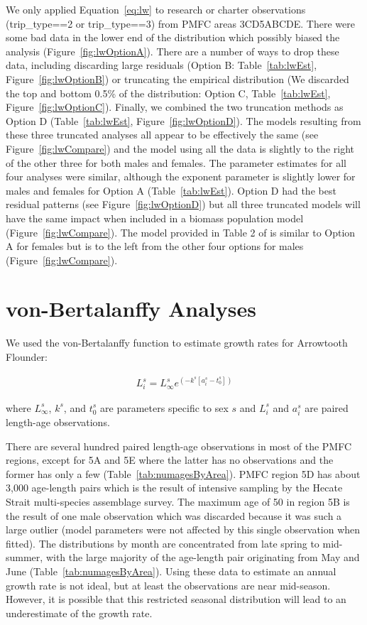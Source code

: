 We only applied Equation~\eqref{eq:lw} to research or charter observations (trip\_type==2 or trip\_type==3) from PMFC areas 3CD5ABCDE. There were some bad data in the lower end of the distribution which possibly biased the analysis (Figure~\ref{fig:lwOptionA}). There are a number of ways to drop these data, including discarding large residuals (Option B: Table~\ref{tab:lwEst}, Figure~\ref{fig:lwOptionB}) or truncating the empirical distribution (We discarded the top and bottom 0.5\% of the distribution: Option C, Table~\ref{tab:lwEst}, Figure~\ref{fig:lwOptionC}). Finally, we combined the two truncation methods as Option D (Table~\ref{tab:lwEst}, Figure~\ref{fig:lwOptionD}). The models resulting from these three truncated analyses all appear to be effectively the same (see Figure~\ref{fig:lwCompare}) and the model using all the data is slightly to the right of the other three for both males and females. The parameter estimates for all four analyses were similar, although the exponent parameter is slightly lower for males and females for Option A (Table~\ref{tab:lwEst}). Option D had the best residual patterns (see Figure~\ref{fig:lwOptionD}) but all three truncated models will have the same impact when included in a biomass population model (Figure~\ref{fig:lwCompare}).  The model provided in Table 2 of \citet{arf2001} is similar to Option A for females but is to the left from the other four options for males (Figure~\ref{fig:lwCompare}).

\section{von-Bertalanffy Analyses}

We used the von-Bertalanffy function to estimate growth rates for Arrowtooth Flounder:

\begin{align} \label{eq:vonb}
L_i^s = L_\infty^se^{(-k^s[a_i^s-t_0^s])}
\end{align}
\begin{addmargin}[3em]{1em}
where $L_\infty^s$, $k^s$, and $t_0^s$ are parameters specific to sex $s$ and $L_i^s$ and $a_i^s$ are paired length-age observations.
\end{addmargin}

There are several hundred paired length-age observations in most of the PMFC regions, except for 5A and 5E where the latter has no observations and the former has only a few (Table~\ref{tab:numagesByArea}). PMFC region 5D has about 3,000 age-length pairs which is the result of intensive sampling by the Hecate Strait multi-species assemblage survey. The maximum age of 50 in region 5B is the result of one male observation which was discarded because it was such a large outlier (model parameters were not affected by this single observation when fitted). The distributions by month are concentrated from late spring to mid-summer, with the large majority of the age-length pair originating from May and June (Table~\ref{tab:numagesByArea}). Using these data to estimate an annual growth rate is not ideal, but at least the observations are near mid-season. However, it is possible that this restricted seasonal distribution will lead to an underestimate of the growth rate.

